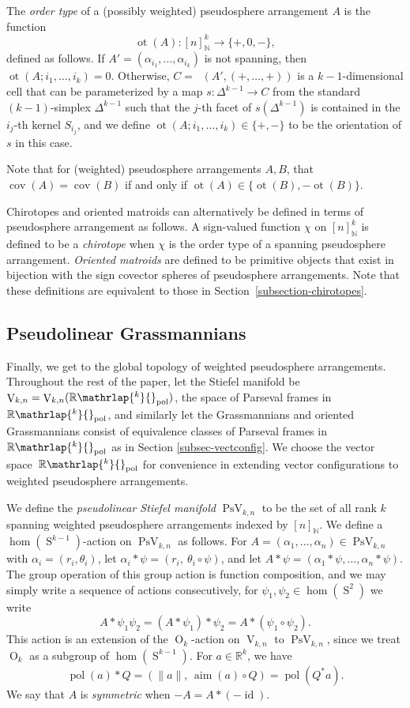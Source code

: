 \documentclass[JEP,XML,SOM,Unicode,NoFloatCountersInSection,published]{cedram}
\theoremstyle{remark}
\let\mb\mathbb
\let\df\emph
\DeclareMathOperator{\orth}{O}
\DeclareMathOperator{\stief}{V}
\DeclareMathOperator{\pstief}{PsV}
\DeclareMathOperator{\sphere}{S}
\DeclareMathOperator{\Cell}{\overline{cell}}
\newcommand{\Rpol}[1]{\mb{R}\mathrlap{{}^{#1}}{}_\text{pol}}
\DeclareMathOperator{\pol}{pol}
\DeclareMathOperator{\aim}{aim}
\DeclareMathOperator{\id}{id}
\DeclareMathOperator{\cov}{cov}
\DeclareMathOperator{\ot}{ot}
\begin{document}
The \df{order type} of a (possibly weighted) pseudosphere arrangement $A$ is the function
\[ \ot (A) : [n]_\mb{N}^k \to \{+,0,-\}, \]
defined as follows.
If $A' = (\alpha_{i_1},\dots,\alpha_{i_k})$ is not spanning, then $\ot(A;i_1,\dots,i_k) = 0$.
Otherwise, $C = \Cell(A',(+,\dots,+))$ is a $k{-}1$-dimensional cell that can be parameterized by a map $s : \Delta^{k-1} \to C$ from the standard $(k{-}1)$-simplex $\Delta^{k-1}$ such that the $j$-th facet of $s(\Delta^{k-1})$ is contained in the $i_j$-th kernel $S_{{i_j}}$,
and we define $\ot(A;i_1,\dots,i_k) \in \{+,-\}$ to be the orientation of $s$ in this case.

Note that for (weighted) pseudosphere arrangements $A,B$, that $\cov(A) = \cov(B)$ if and only if $\ot(A) \in \{\ot(B),-\ot(B)\}$.

Chirotopes and oriented matroids can alternatively be defined in terms of pseudosphere arrangement as follows.
A sign-valued function $\chi$ on $[n]_\mb{N}^k$ is defined to be a \df{chirotope} when $\chi$ is the order type of a spanning pseudosphere arrangement.
\df{Oriented matroids} are defined to be primitive objects that exist in bijection with the sign covector spheres of pseudosphere arrangements.
Note that these definitions are equivalent to those in Section~\ref{subsection-chirotopes}.

\subsection{Pseudolinear Grassmannians}\label{subsection-psg-def}

Finally, we get to the global topology of weighted pseudosphere arrangements.
Throughout the rest of the paper, let the Stiefel manifold be $\stief_{k,n} = \stief_{k,n}(\Rpol{k})$, \ie the space of Parseval frames in $\Rpol{k}$, and similarly let the Grassmannians and oriented Grassmannians consist of equivalence classes of Parseval frames in $\Rpol{k}$ as in Section \ref{subsec-vectconfig}. We choose the vector space~$\Rpol{k}$ for convenience in extending vector configurations to weighted pseudosphere arrangements.

We define the \df{pseudolinear Stiefel manifold} $\pstief_{k,n}$ to be the set of all rank $k$ spanning weighted pseudosphere arrangements indexed by $[n]_\mb{N}$.
We define a $\hom(\sphere^{k-1})$-action on $\pstief_{k,n}$ as follows.
For $A = (\alpha_1,\dots,\alpha_n) \in \pstief_{k,n}$ with $\alpha_i = (r_i,\theta_i)$, let
$\alpha_i * \psi = (r_i,\ \theta_i \circ \psi)$, and let
$A*\psi = (\alpha_1*\psi,\dots,\alpha_n*\psi)$. The group operation of this group action is function composition, and we may simply write a sequence of actions consecutively, \ie for $\psi_1,\psi_2 \in \hom(\sphere^2)$ we write
\[ A*\psi_1\psi_2 = (A*\psi_1)*\psi_2 = A*(\psi_1\circ\psi_2). \]
This action is an extension of the $\orth_k$-action on $\stief_{k,n}$ to $\pstief_{k,n}$, since we treat $\orth_k$ as a subgroup of $\hom(\sphere^{k-1})$. For $a \in \mb{R}^k$, we have
\[ \pol(a)*Q = (\|a\|,\, \aim (a) \circ Q) = \pol(Q^* a).\]
We say that $A$ is \df{symmetric} when $-A = A*(-\id)$.
\end{document}
